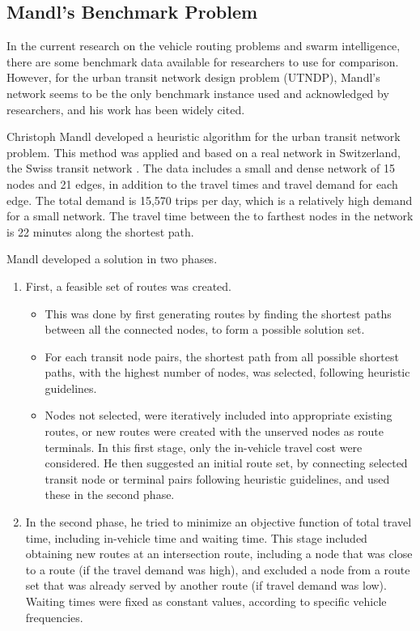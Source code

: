 \subsection{Mandl's Benchmark Problem}

In the current research on the vehicle routing problems and swarm intelligence, there are some benchmark data available for researchers to use for comparison. However, for the urban transit network design problem (UTNDP), Mandl's network seems to be the only benchmark instance used and acknowledged by researchers, and his work has been widely cited. %

Christoph Mandl developed a heuristic algorithm for the urban transit network problem. This method was applied and based on a real network in Switzerland, the Swiss transit network \citep{mandl79} . The data includes a small and dense network of 15 nodes and 21 edges, in addition to the travel times and travel demand for each edge. The total demand is 15,570 trips per day, which is a relatively high demand for a small network. The travel time between the to farthest nodes in the network is 22 minutes along the shortest path. 

Mandl developed a solution in two phases. 

\begin{enumerate}
\item First, a feasible set of routes was created. 
\begin{itemize}
\item This was done by first generating routes by finding the shortest paths between all the connected nodes, to form a possible solution set. %
\item For each transit node pairs, the shortest path from all possible shortest paths, with the highest number of nodes, was selected, following heuristic guidelines. 
\item Nodes not selected, were iteratively included into appropriate existing routes, or new routes were created with the unserved nodes as route terminals. 
In this first stage, only the in-vehicle travel cost were considered. He then suggested an initial route set, by connecting selected transit node or terminal pairs following heuristic guidelines, and used these in the second phase. 
\end{itemize}
\item In the second phase, he tried to minimize an objective function of total travel time, including in-vehicle time and waiting time. This stage included obtaining new routes at an intersection route, including a node that was close to a route (if the travel demand was high), and excluded a node from a route set that was already served by another route (if travel demand was low). Waiting times were fixed as constant values, according to specific vehicle frequencies.  
\end{enumerate}

